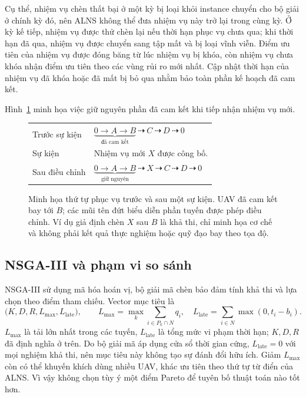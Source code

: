 \documentclass[11pt,a4paper]{article}
\begin{document}
Cụ thể, nhiệm vụ chèn thất bại ở một kỳ bị loại khỏi instance chuyển cho bộ giải ở chính kỳ đó, nên ALNS không thể đưa nhiệm vụ này trở lại trong cùng kỳ. Ở kỳ kế tiếp, nhiệm vụ được thử chèn lại nếu thời hạn phục vụ chưa qua; khi thời hạn đã qua, nhiệm vụ được chuyển sang tập mất và bị loại vĩnh viễn. Điểm ưu tiên của nhiệm vụ được đóng băng từ lúc nhiệm vụ bị khóa, còn nhiệm vụ chưa khóa nhận điểm ưu tiên theo các vùng rủi ro mới nhất. Cập nhật thời hạn của nhiệm vụ đã khóa hoặc đã mất bị bỏ qua nhằm bảo toàn phần kế hoạch đã cam kết.

Hình~\ref{fig:route-update} minh họa việc giữ nguyên phần đã cam kết khi tiếp nhận nhiệm vụ mới.

\begin{figure}[htbp]
\centering
\begin{tabular}{@{}ll@{}}
\toprule
Trước sự kiện & $\underbrace{0\to A\to B}_{\text{đã cam kết}}\ \dashrightarrow\ C\ \dashrightarrow\ D\ \dashrightarrow\ 0$\\[12pt]
Sự kiện & Nhiệm vụ mới $X$ được công bố.\\[8pt]
Sau điều chỉnh & $\underbrace{0\to A\to B}_{\text{giữ nguyên}}\ \dashrightarrow\ X\ \dashrightarrow\ C\ \dashrightarrow\ D\ \dashrightarrow\ 0$\\
\bottomrule
\end{tabular}
\caption{Minh họa thứ tự phục vụ trước và sau một sự kiện. UAV đã cam kết bay tới $B$; các mũi tên đứt biểu diễn phần tuyến được phép điều chỉnh. Ví dụ giả định chèn $X$ sau $B$ là khả thi, chỉ minh họa cơ chế và không phải kết quả thực nghiệm hoặc quỹ đạo bay theo tọa độ.}
\label{fig:route-update}
\end{figure}

\subsection{NSGA-III và phạm vi so sánh}
NSGA-III sử dụng mã hóa hoán vị, bộ giải mã chèn bảo đảm tính khả thi và lựa chọn theo điểm tham chiếu. Vector mục tiêu là
\begin{equation}
 \bigl(K,D,R,L_{\max},L_{\mathrm{late}}\bigr),\qquad
 L_{\max}=\max_k\sum_{i\in P_k\cap N}q_i,\quad
 L_{\mathrm{late}}=\sum_{i\in N}\max(0,t_i-b_i).
\end{equation}
$L_{\max}$ là tải lớn nhất trong các tuyến, $L_{\mathrm{late}}$ là tổng mức vi phạm thời hạn; $K,D,R$ đã định nghĩa ở trên. Do bộ giải mã áp dụng cửa sổ thời gian cứng, $L_{\mathrm{late}}=0$ với mọi nghiệm khả thi, nên mục tiêu này không tạo sự đánh đổi hữu ích. Giảm $L_{\max}$ còn có thể khuyến khích dùng nhiều UAV, khác ưu tiên theo thứ tự từ điển của ALNS. Vì vậy không chọn tùy ý một điểm Pareto để tuyên bố thuật toán nào tốt hơn.
\end{document}
